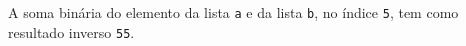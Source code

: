 \documentclass[12pt,varwidth=16cm,border=1pt]{standalone}
\begin{document}
A soma binária do elemento da lista \verb+a+ e da lista \verb+b+, no índice \verb+5+, tem como resultado inverso \verb+55+.

\questiomtrue
\end{document}
